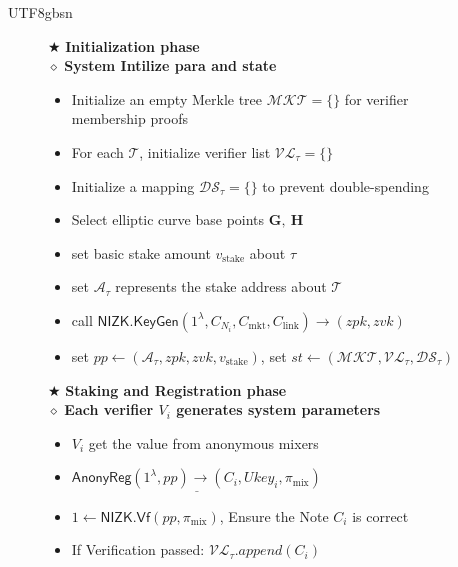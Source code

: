 \documentclass[runningheads]{llncs}
\newcommand{\nizk}{\mathsf{NIZK}}
\newcommand{\nizkvf}{\mathsf{NIZK.Vf}}
\newcommand{\keygen}{\mathsf{KeyGen}}
\begin{document}
\begin{CJK*}{UTF8}{gbsn}
\begin{figure}[h!]
{{\vspace{-6pt}
$\bigstar$     \textbf{Initialization phase} \\    
$\diamond$ \textbf{System Intilize para and state}
\vspace{-8pt}
    \begin{itemize}
        \item Initialize an empty Merkle tree $\mathcal{MKT} = \{\}$ for verifier membership proofs
        \item For each $\mathcal{T}$, initialize verifier list $\mathcal{VL}_\tau = \{\}$
        \item Initialize a mapping $\mathcal{DS}_\tau = \{\}$ to prevent double-spending
        \item Select elliptic curve base points $ \mathbf{G},\ \mathbf{H} $
        \item set basic stake amount $v_{\text{stake}}$ about $\tau$
        \item set $\mathcal{A_\tau}$ represents the  stake address about $\mathcal{T}$
        \item call $\nizk.\keygen(1^\lambda, C_{N_i}, C_\text{mkt}, C_\text{link})\rightarrow (zpk,zvk)$
        \item set $ pp \leftarrow (\mathcal{A_\tau}, zpk, zvk, v_{\text{stake}}) $, set $st \leftarrow (\mathcal{MKT}, \mathcal{VL_\tau}, \mathcal{DS}_\tau ) $
    \end{itemize}
    
\vspace{-8pt}
$\bigstar$     \textbf{Staking and Registration phase} \\
$\diamond$ \textbf{Each verifier $V_i$ generates system parameters} 
\vspace{-8pt}
    \begin{itemize}
        \item $V_i$ get the value from anonymous mixers
        \item $ \underline{ \mathsf{AnonyReg}(1^\lambda, pp) \rightarrow (C_i, Ukey_i, \pi_{\text{mix}})} $
        \item $1 \leftarrow \nizkvf(pp, \pi_\text{mix})$, Ensure the Note $C_i$ is correct
        \item If Verification passed: $\mathcal{VL}_\tau .append(C_i)$
    \end{itemize}             
\vspace{-8pt}

}}
\end{figure}
\end{CJK*}
\end{document}
